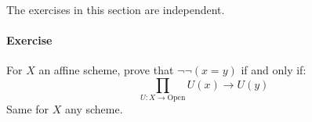 The exercises in this section are independent.

\paragraph{Exercise}{
For $X$ an affine scheme, prove that $\neg\neg(x=y)$ if and only if:
\[\prod_{U:X\to \mathrm{Open}} U(x)\to U(y)\]
Same for $X$ any scheme.
}